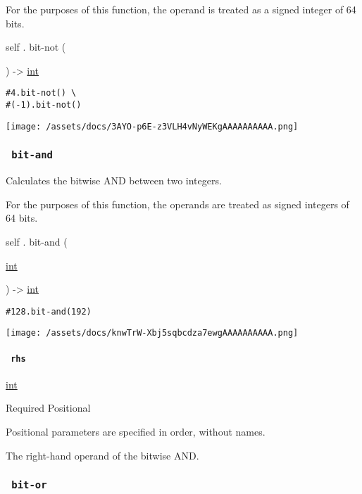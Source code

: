 For the purposes of this function, the operand is treated as a signed
integer of 64 bits.

self { . } { bit-not } (

) -\textgreater{} \href{/docs/reference/foundations/int/}{int}

\begin{verbatim}
#4.bit-not() \
#(-1).bit-not()
\end{verbatim}

\texttt{[image: /assets/docs/3AYO-p6E-z3VLH4vNyWEKgAAAAAAAAAA.png]}

\subsubsection{\texorpdfstring{\texttt{\ bit-and\ }}{ bit-and }}\label{definitions-bit-and}

Calculates the bitwise AND between two integers.

For the purposes of this function, the operands are treated as signed
integers of 64 bits.

self { . } { bit-and } (

{ \href{/docs/reference/foundations/int/}{int} }

) -\textgreater{} \href{/docs/reference/foundations/int/}{int}

\begin{verbatim}
#128.bit-and(192)
\end{verbatim}

\texttt{[image: /assets/docs/knwTrW-Xbj5sqbcdza7ewgAAAAAAAAAA.png]}

\paragraph{\texorpdfstring{\texttt{\ rhs\ }}{ rhs }}\label{definitions-bit-and-rhs}

\href{/docs/reference/foundations/int/}{int}

{Required} {{ Positional }}

\label{definitions-bit-and-rhs-positional-tooltip}
Positional parameters are specified in order, without names.

The right-hand operand of the bitwise AND.

\subsubsection{\texorpdfstring{\texttt{\ bit-or\ }}{ bit-or }}\label{definitions-bit-or}

